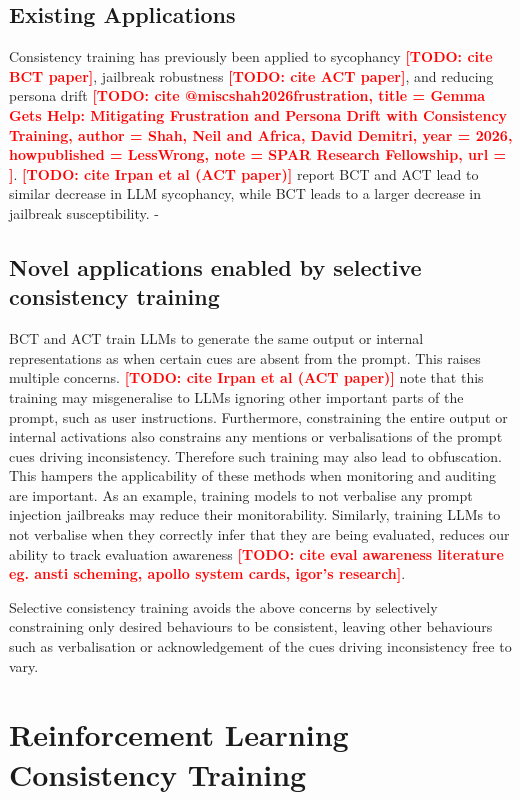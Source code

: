 \documentclass{article}
\newcommand{\todo}[1]{\textcolor{red}{\textbf{[TODO: #1]}}}
\begin{document}
\subsection{Existing Applications}
Consistency training has previously been applied to sycophancy \todo{cite BCT paper}, jailbreak robustness \todo{cite ACT paper}, and reducing persona drift \todo{cite @misc{shah2026frustration,
  title        = {Gemma Gets Help: Mitigating Frustration and Persona Drift with Consistency Training},
  author       = {Shah, Neil and Africa, David Demitri},
  year         = {2026},
  howpublished = {LessWrong},
  note         = {SPAR Research Fellowship},
  url          = {}}
}. \todo{cite Irpan et al (ACT paper)} report BCT and ACT lead to similar decrease in LLM sycophancy, while BCT leads to a larger decrease in jailbreak susceptibility. 
- 

\subsection{Novel applications enabled by selective consistency training}
\label{sec:novel-applications}

BCT and ACT train LLMs to generate the same output or internal
representations as when certain cues are absent from the prompt. This raises multiple concerns. \todo{cite Irpan et al (ACT paper)} note that this training may misgeneralise to LLMs ignoring other important parts of the prompt, such as user instructions. Furthermore, constraining the entire output or internal activations also constrains any mentions or verbalisations of the prompt cues driving inconsistency. Therefore such training may also lead to obfuscation. This hampers the applicability of these methods when monitoring and auditing are important. As an example, training models to not verbalise any prompt injection jailbreaks may reduce their monitorability. Similarly, training LLMs to not verbalise when they correctly infer that they are being evaluated, reduces our ability to track evaluation awareness \todo{cite eval awareness literature eg. ansti scheming, apollo system cards, igor's research}. 

Selective consistency training avoids the above concerns by selectively constraining only desired behaviours to be consistent, leaving other behaviours such as verbalisation or acknowledgement of the cues driving inconsistency free to vary. 

\section{Reinforcement Learning Consistency Training}
\end{document}
